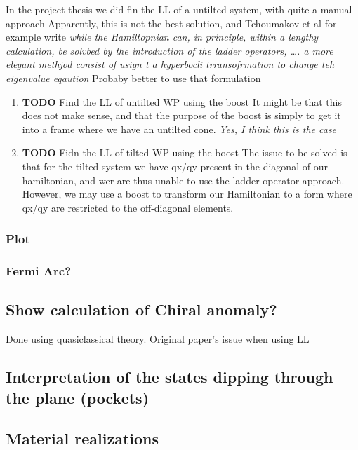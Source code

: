 \documentclass[11pt]{article}
\begin{document}
In the project thesis we did fin the LL of a untilted system, with quite a manual approach
Apparently, this is not the best solution, and Tchoumakov et al for example write \emph{while the Hamiltopnian can, in principle, within a lengthy calculation, be solvbed by the introduction of the ladder operators, \ldots{}. a more elegant methjod consist of usign t a hyperbocli trransofrmation to change teh eigenvalue eqaution}
Probaby better to use that formulation

\begin{enumerate}
\item {\bfseries\sffamily TODO} Find the LL of untilted WP using the boost
\label{sec:orgf8c406f}
It might be that this does not make sense, and that the purpose of the boost is simply to get it into a frame where we have an untilted cone.
\emph{Yes, I think this is the case}

\item {\bfseries\sffamily TODO} Fidn the LL of tilted WP using the boost
\label{sec:orgcf34e8e}
The issue to be solved is that for the tilted system we have qx/qy present in the diagonal of our hamiltonian, and wer are thus unable to use the ladder operator approach.
However, we may use a boost to transform our Hamiltonian to a form where qx/qy are restricted to the off-diagonal elements.
\end{enumerate}

\subsubsection{Plot}
\label{sec:org94d1b5e}

\subsubsection{Fermi Arc?}
\label{sec:org9c982e6}

\subsection{Show calculation of Chiral anomaly?}
\label{sec:org25ef014}
Done using quasiclassical theory.
Original paper's issue when using LL

\subsection{Interpretation of the states dipping through the plane (pockets)}
\label{sec:orgf8fbf90}

\subsection{Material realizations}
\label{sec:org332ac94}
\end{document}
